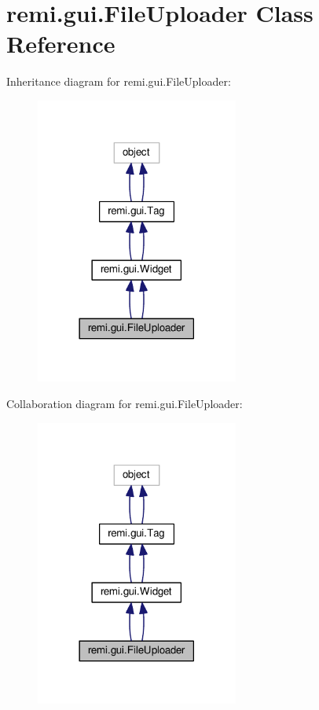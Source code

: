 \hypertarget{classremi_1_1gui_1_1FileUploader}{}\section{remi.\+gui.\+File\+Uploader Class Reference}
\label{classremi_1_1gui_1_1FileUploader}


Inheritance diagram for remi.\+gui.\+File\+Uploader\+:
\nopagebreak
\begin{figure}[H]
\begin{center}
\leavevmode
\includegraphics[width=189pt]{d5/daa/classremi_1_1gui_1_1FileUploader__inherit__graph}
\end{center}
\end{figure}


Collaboration diagram for remi.\+gui.\+File\+Uploader\+:
\nopagebreak
\begin{figure}[H]
\begin{center}
\leavevmode
\includegraphics[width=189pt]{d8/df7/classremi_1_1gui_1_1FileUploader__coll__graph}
\end{center}
\end{figure}
